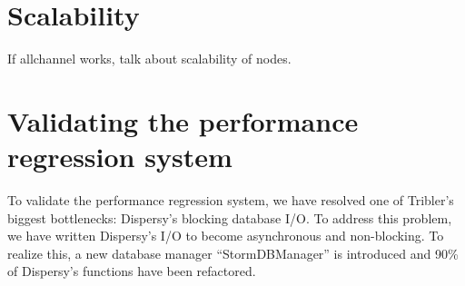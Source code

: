 \section{Scalability}

If allchannel works, talk about scalability of nodes. 

\section{Validating the performance regression system}

To validate the performance regression system, we have resolved one of Tribler's biggest bottlenecks: Dispersy's blocking database I/O.
To address this problem, we have written Dispersy's I/O to become asynchronous and non-blocking.
To realize this, a new database manager \enquote{StormDBManager} is introduced and 90\% of Dispersy's functions have been refactored.

